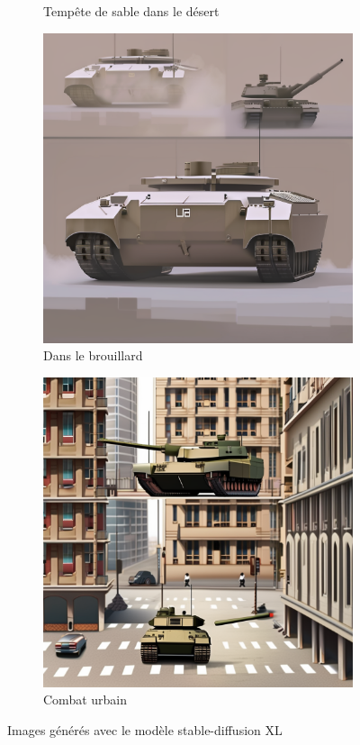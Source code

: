\begin{figure}[H]
\begin{subfigure}[b]{0.49\textwidth}
        \caption{Tempête de sable dans le désert}
    \end{subfigure}
    \hfill
    \begin{subfigure}[b]{0.49\textwidth}
        \centering
        \includegraphics[width=\textwidth]{./images/xl_tank-fog-2.png}
        \caption{Dans le brouillard}
    \end{subfigure}
    \begin{subfigure}[b]{0.49\textwidth}
        \centering
        \includegraphics[width=\textwidth]{./images/xl_tank-urban_combat-1.png}
        \caption{Combat urbain}
    \end{subfigure}
    \caption{Images générés avec le modèle stable-diffusion XL}
    \label{fig:image_sdxl}
\end{figure}


